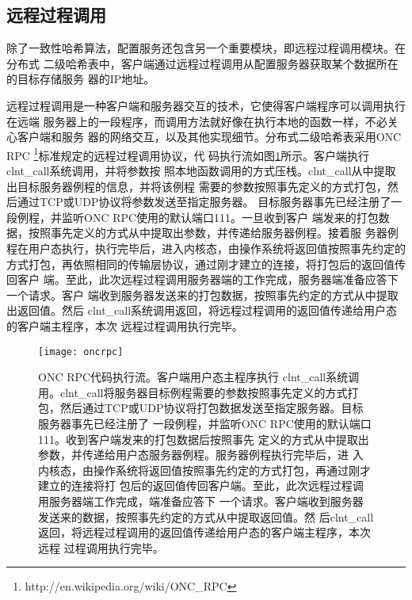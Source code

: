 \subsection{远程过程调用}
除了一致性哈希算法，配置服务还包含另一个重要模块，即远程过程调用模块。在分布式
二级哈希表中，客户端通过远程过程调用从配置服务器获取某个数据所在的目标存储服务
器的IP地址。

远程过程调用是一种客户端和服务器交互的技术，它使得客户端程序可以调用执行在远端
服务器上的一段程序，而调用方法就好像在执行本地的函数一样，不必关心客户端和服务
器的网络交互，以及其他实现细节。分布式二级哈希表采用ONC RPC
\footnote{http://en.wikipedia.org/wiki/ONC\_RPC}标准规定的远程过程调用协议，代
码执行流如图\ref{figure:oncrpc}所示。客户端执行clnt\_call系统调用，并将参数按
照本地函数调用的方式压栈。clnt\_call从中提取出目标服务器例程的信息，并将该例程
需要的参数按照事先定义的方式打包，然后通过TCP或UDP协议将参数发送至指定服务器。
目标服务器事先已经注册了一段例程，并监听ONC RPC使用的默认端口111。一旦收到客户
端发来的打包数据，按照事先定义的方式从中提取出参数，并传递给服务器例程。接着服
务器例程在用户态执行，执行完毕后，进入内核态，由操作系统将返回值按照事先约定的
方式打包，再依照相同的传输层协议，通过刚才建立的连接，将打包后的返回值传回客户
端。至此，此次远程过程调用服务器端的工作完成，服务器端准备应答下一个请求。客户
端收到服务器发送来的打包数据，按照事先约定的方式从中提取出返回值。然后
clnt\_call系统调用返回，将远程过程调用的返回值传递给用户态的客户端主程序，本次
远程过程调用执行完毕。
\begin{figure}
  \centering
  \texttt{[image: oncrpc]}
  \caption[ONC RPC代码执行流]{ONC RPC代码执行流。客户端用户态主程序执行
  clnt\_call系统调用。clnt\_call将服务器目标例程需要的参数按照事先定义的方式打
  包，然后通过TCP或UDP协议将打包数据发送至指定服务器。目标服务器事先已经注册了
  一段例程，并监听ONC RPC使用的默认端口111。收到客户端发来的打包数据后按照事先
  定义的方式从中提取出参数，并传递给用户态服务器例程。服务器例程执行完毕后，进
  入内核态，由操作系统将返回值按照事先约定的方式打包，再通过刚才建立的连接将打
  包后的返回值传回客户端。至此，此次远程过程调用服务器端工作完成，端准备应答下
  一个请求。客户端收到服务器发送来的数据，按照事先约定的方式从中提取返回值。然
  后clnt\_call返回，将远程过程调用的返回值传递给用户态的客户端主程序，本次远程
  过程调用执行完毕。}
  \label{figure:oncrpc}
\end{figure}

